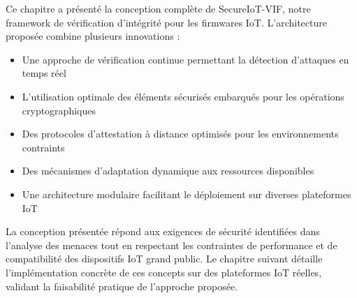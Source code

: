 Ce chapitre a présenté la conception complète de SecureIoT-VIF, notre framework de vérification d'intégrité pour les firmwares IoT. L'architecture proposée combine plusieurs innovations :

\begin{itemize}
    \item Une approche de vérification continue permettant la détection d'attaques en temps réel
    \item L'utilisation optimale des éléments sécurisés embarqués pour les opérations cryptographiques
    \item Des protocoles d'attestation à distance optimisés pour les environnements contraints
    \item Des mécanismes d'adaptation dynamique aux ressources disponibles
    \item Une architecture modulaire facilitant le déploiement sur diverses plateformes IoT
\end{itemize}

La conception présentée répond aux exigences de sécurité identifiées dans l'analyse des menaces tout en respectant les contraintes de performance et de compatibilité des dispositifs IoT grand public. Le chapitre suivant détaille l'implémentation concrète de ces concepts sur des plateformes IoT réelles, validant la faisabilité pratique de l'approche proposée.